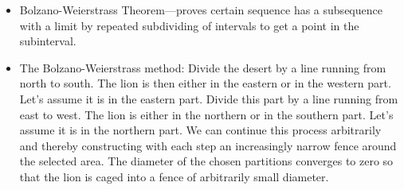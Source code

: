 \documentclass{article}
\begin{document}
\begin{itemize}
\item Bolzano-Weierstrass Theorem---proves certain sequence has a subsequence with a limit by repeated subdividing of intervals to get a point in the subinterval.

\item The Bolzano-Weierstrass method: Divide the desert by a line running from north to south. The lion is then either in the eastern or in the western part. Let's assume it is in the eastern part. Divide this part by a line running from east to west. The lion is either in the northern or in the southern part. Let's assume it is in the northern part. We can continue this process arbitrarily and thereby constructing with each step an increasingly narrow fence around the selected area. The diameter of the chosen partitions converges to zero so that the lion is caged into a fence of arbitrarily small diameter.
\end{itemize}
\end{document}
